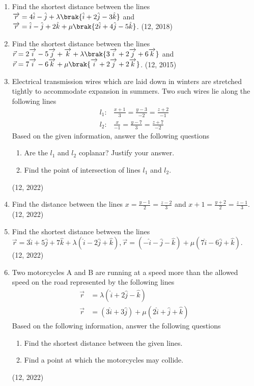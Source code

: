 \begin{enumerate}[label=\thesubsection.\arabic*,ref=\thesubsection.\theenumi]
\item Find the shortest distance between the lines 
	$\overrightarrow{r} = 4\hat{i} - \hat{j} + \lambda \brak{\hat{i} + 2\hat{j} - 3\hat{k}}$ 
and
		$\overrightarrow{r}= \hat{i} - \hat{j} + 2\hat{k} + \mu \brak{2\hat{i} + 4\hat{j} - 5\hat{k}}$.
\hfill (12, 2018)
\item Find the shortest distance between the lines
$\vec{r} = 2\overrightarrow{i}-5\overrightarrow{j}+\overrightarrow{k} +\lambda\brak{3\overrightarrow{i}+2\overrightarrow{j}+6\overrightarrow{k}}$ and $\vec{r} = 7\overrightarrow{i}-6\overrightarrow{k}+\mu\brak{\overrightarrow{i}+2\overrightarrow{j}+2\overrightarrow{k}}$. \hfill (12, 2015)
\item Electrical transmission wires which are laid down in winters are stretched tightly to accommodate expansion in summers.
	Two such wires  lie along the following lines
	\begin{align*}
		l_1: & \frac{x+1}{3}=\frac{y-3}{-2}=\frac{z+2}{-1}\\
		l_2: & \frac{x}{-1}=\frac{y-7}{3}=\frac{z+7}{-2}
	\end{align*}
	Based on the given information, answer the following questions
	\begin{enumerate}
		\item	Are the $l_1$ and $l_2$ coplanar? Justify your answer.
		\item    Find the point of intersection of lines $l_1$ and $l_2$.
	\end{enumerate}
\hfill (12, 2022)
\item Find the distance between the lines $x=\frac{y-1}{2}=\frac{z-2}{3}$ and $x+1=\frac{y+2}{2}=\frac{z-1}{3}$. \hfill (12, 2022)

\item Find the shortest distance between the lines
		$\vec{r}=3\hat{i}+5\hat{j}+7\hat{k}+\lambda(\hat{i}-2\hat{j}+\hat{k}),
		\vec{r}=(-\hat{i}-\hat{j}-\hat{k})+\mu(7\hat{i}-6\hat{j}+\hat{k})$.
\hfill (12, 2022)
\item Two motorcycles A and B are running at a speed more than the allowed speed on the road  represented by the following lines 
	\begin{align*}
		\vec{r}&=\lambda(\hat{i}+2\hat{j}-\hat{k})\\
		\vec{r}&=(3\hat{i}+3\hat{j})+\mu(2\hat{i}+\hat{j}+\hat{k})
	\end{align*}
	Based on the following information, answer the following questions
	\begin{enumerate}
		\item Find the shortest distance between the given lines.
		\item Find a point at which the motorcycles may collide.
	\end{enumerate}
\hfill (12, 2022)


\end{enumerate}
